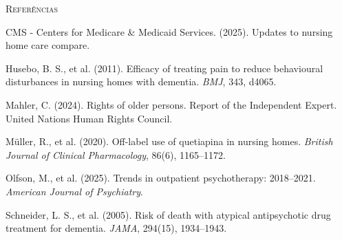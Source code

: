 \vspace{2em}
\begin{small}
\noindent\textsc{Referências}

\vspace{1em}
\noindent CMS - Centers for Medicare \& Medicaid Services. (2025). Updates to nursing home care compare.

\noindent Husebo, B. S., et al. (2011). Efficacy of treating pain to reduce behavioural disturbances in nursing homes with dementia. \textit{BMJ}, 343, d4065.

\noindent Mahler, C. (2024). Rights of older persons. Report of the Independent Expert. United Nations Human Rights Council.

\noindent Müller, R., et al. (2020). Off-label use of quetiapina in nursing homes. \textit{British Journal of Clinical Pharmacology}, 86(6), 1165--1172.

\noindent Olfson, M., et al. (2025). Trends in outpatient psychotherapy: 2018--2021. \textit{American Journal of Psychiatry}.

\noindent Schneider, L. S., et al. (2005). Risk of death with atypical antipsychotic drug treatment for dementia. \textit{JAMA}, 294(15), 1934--1943.
\end{small}

